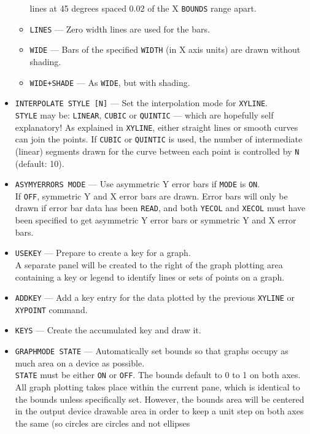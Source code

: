 \documentclass[a4paper,twoside,11pt]{article}
\newcommand{\textttc}[1]{\texttt{\textcolor{OurRed}{#1}}}
\begin{document}
\begin{itemize}
\begin{itemize}
   lines at 45 degrees spaced 0.02 of the X \texttt{BOUNDS} range
   apart.
   \item \textttc{LINES} --- Zero width lines are used for the bars.
   \item \textttc{WIDE} --- Bars of the specified \texttt{WIDTH} (in X axis units) are drawn without shading.
   \item \textttc{WIDE+SHADE} --- As \texttt{WIDE}, but with shading.
   \end{itemize}
\item \textttc{INTERPOLATE STYLE [N]} --- Set the interpolation mode for \texttt{XYLINE}.\\
   \texttt{STYLE} may be: \texttt{LINEAR}, \texttt{CUBIC} or \texttt{QUINTIC} --- which are hopefully self explanatory!
   As explained in \texttt{XYLINE}, either straight lines or smooth curves can join the points. 
   If \texttt{CUBIC} or \texttt{QUINTIC} is used, the
   number of intermediate (linear) segments drawn for the curve between each point is controlled by \texttt{N} (default: 10).
\item \textttc{ASYMYERRORS MODE} --- Use asymmetric Y error bars if \texttt{MODE} is \texttt{ON}.\\
   If \texttt{OFF}, symmetric Y and X error bars are drawn. Error bars will only be drawn if error bar
   data has been \texttt{READ}, and both \texttt{YECOL} and \texttt{XECOL} must have been 
   specified to get asymmetric Y error bars or
   symmetric Y and X error bars.
 \item \textttc{USEKEY} --- Prepare to create a key for a graph.\\
   A separate panel will be created to the right of the graph plotting area containing a key or legend
   to identify lines or sets of points on a graph.
 \item \textttc{ADDKEY} --- Add a key entry for the data plotted by the previous \texttt{XYLINE} or \texttt{XYPOINT} command.
 \item \textttc{KEYS} --- Create the accumulated key and draw it.
 \item \textttc{GRAPHMODE STATE} --- Automatically set bounds so that graphs occupy as much area on a device as possible.\\
   \texttt{STATE} must be either \texttt{ON} or \texttt{OFF}. The bounds default to 0 to 1 on both axes. All graph plotting takes place within the
   current pane, which is identical to the bounds unless specifically set. However, the bounds area will be centered in the
   output device drawable area in order to keep a unit step on both axes the same (so circles are circles and not ellipses

\end{itemize}
\end{document}
